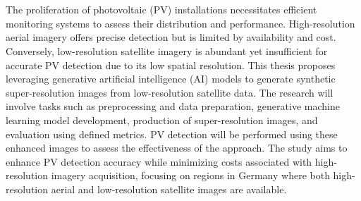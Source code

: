 \chapter{\abstractname}

The proliferation of photovoltaic (PV) installations necessitates efficient monitoring systems to assess their distribution and performance. High-resolution aerial imagery offers precise detection but is limited by availability and cost. Conversely, low-resolution satellite imagery is abundant yet insufficient for accurate PV detection due to its low spatial resolution. This thesis proposes leveraging generative artificial intelligence (AI) models to generate synthetic super-resolution images from low-resolution satellite data. The research will involve tasks such as preprocessing and data preparation, generative machine learning model development, production of super-resolution images, and evaluation using defined metrics. PV detection will be performed using these enhanced images to assess the effectiveness of the approach. The study aims to enhance PV detection accuracy while minimizing costs associated with high-resolution imagery acquisition, focusing on regions in Germany where both high-resolution aerial and low-resolution satellite images are available.